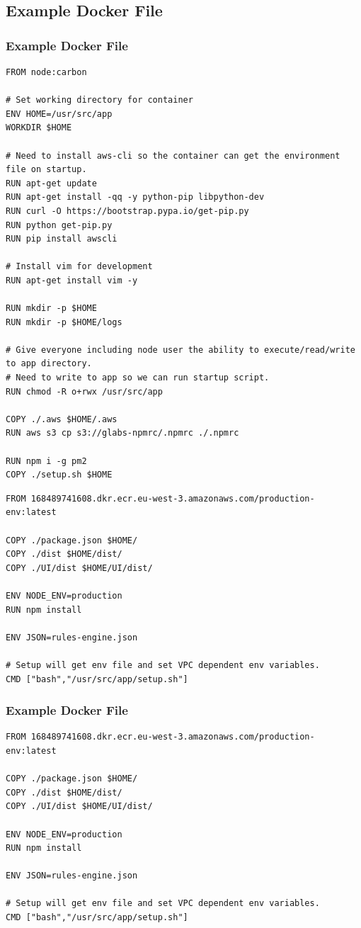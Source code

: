 \documentclass{beamer}
\begin{document}
\subsection{Example Docker File} 
\begin{frame}[fragile] 
\frametitle{Example Docker File}
\begin{example}
\tiny
\begin{verbatim}
FROM node:carbon

# Set working directory for container
ENV HOME=/usr/src/app
WORKDIR $HOME

# Need to install aws-cli so the container can get the environment file on startup.
RUN apt-get update
RUN apt-get install -qq -y python-pip libpython-dev 
RUN curl -O https://bootstrap.pypa.io/get-pip.py
RUN python get-pip.py
RUN pip install awscli

# Install vim for development
RUN apt-get install vim -y

RUN mkdir -p $HOME
RUN mkdir -p $HOME/logs

# Give everyone including node user the ability to execute/read/write to app directory.
# Need to write to app so we can run startup script.
RUN chmod -R o+rwx /usr/src/app 

COPY ./.aws $HOME/.aws
RUN aws s3 cp s3://glabs-npmrc/.npmrc ./.npmrc

RUN npm i -g pm2
COPY ./setup.sh $HOME
\end{verbatim}
\end{example}
\begin{example}
\tiny
\begin{verbatim}
FROM 168489741608.dkr.ecr.eu-west-3.amazonaws.com/production-env:latest

COPY ./package.json $HOME/
COPY ./dist $HOME/dist/
COPY ./UI/dist $HOME/UI/dist/

ENV NODE_ENV=production
RUN npm install

ENV JSON=rules-engine.json

# Setup will get env file and set VPC dependent env variables.
CMD ["bash","/usr/src/app/setup.sh"]
\end{verbatim}
\end{example}
\end{frame}


\begin{frame}[fragile] 
\frametitle{Example Docker File}
\begin{example}
\tiny
\begin{verbatim}
FROM 168489741608.dkr.ecr.eu-west-3.amazonaws.com/production-env:latest

COPY ./package.json $HOME/
COPY ./dist $HOME/dist/
COPY ./UI/dist $HOME/UI/dist/

ENV NODE_ENV=production
RUN npm install

ENV JSON=rules-engine.json

# Setup will get env file and set VPC dependent env variables.
CMD ["bash","/usr/src/app/setup.sh"]
\end{verbatim}
\end{example}
\end{frame}
\end{document}
